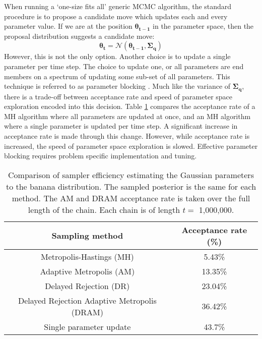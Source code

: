 When running a `one-size fits all' generic MCMC algorithm, the standard procedure is to propose a candidate move which updates each and every parameter value. If we are at the position $\bm{\theta_{t-1}}$ in the parameter space, then the proposal distribution suggests a candidate move:
\begin{equation}
	\bm{\theta_{t}} = \mathcal{N}(\bm{\theta_{t-1}},\bm{\Sigma_q})
\end{equation}
However, this is not the only option. Another choice is to update a single parameter per time step. The choice to update one, or all parameters are end members on a spectrum of updating some sub-set of all parameters. This technique is referred to as parameter blocking \citep{Roberts1997,Sargent2000}. Much like the variance of $\bm{\Sigma_q}$, there is a trade-off between acceptance rate and speed of parameter space exploration encoded into this decision. Table \ref{sampling-method-comparison} compares the acceptance rate of a MH algorithm where all parameters are updated at once, and an MH algorithm where a single parameter is updated per time step. A significant increase in acceptance rate is made through this change. However, while acceptance rate is increased, the speed of parameter space exploration is slowed. Effective parameter blocking requires problem specific implementation and tuning. 

\begin{table}[H]
	\centering
	\begin{tabular}{|c|c|}
	\hline
	Sampling method & Acceptance rate (\%) \\
	\hline
	Metropolis-Hastings (MH) & 5.43\% \\
	\hline
	Adaptive Metropolis (AM) & 13.35\% \\
	\hline
	Delayed Rejection (DR) & 23.04\% \\
	\hline
	Delayed Rejection Adaptive Metropolis (DRAM) & 36.42\% \\
	\hline
	Single parameter update & 43.7\% \\
	\hline
	\end{tabular}
	\caption{Comparison of sampler efficiency estimating the Gaussian parameters to the banana distribution. The sampled posterior is the same for each method. The AM and DRAM acceptance rate is taken over the full length of the chain. Each chain is of length $t = $ 1,000,000.}
	\label{sampling-method-comparison}
\end{table}

